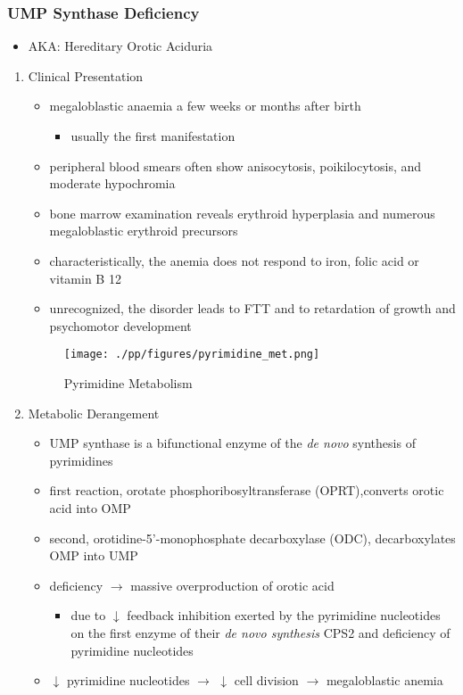 \documentclass{scrartcl}
\begin{document}
\subsubsection{UMP Synthase Deficiency}
\label{sec:orgcf6b37e}
\begin{itemize}
\item AKA: Hereditary Orotic Aciduria
\end{itemize}
\begin{enumerate}
\item Clinical Presentation
\label{sec:orgd7c03c6}
\begin{itemize}
\item megaloblastic anaemia a few weeks or months after birth
\begin{itemize}
\item usually the first manifestation
\end{itemize}
\item peripheral blood smears often show anisocytosis, poikilocytosis, and
moderate hypochromia
\item bone marrow examination reveals erythroid hyperplasia and numerous
megaloblastic erythroid precursors
\item characteristically, the anemia does not respond to iron, folic acid
or vitamin B 12
\item unrecognized, the disorder leads to FTT and to retardation of growth
and psychomotor development
\end{itemize}

\begin{figure}[htbp]
\centering
\texttt{[image: ./pp/figures/pyrimidine\_met.png]}
\caption{\label{fig:org9fbfec8}
Pyrimidine Metabolism}
\end{figure}

\item Metabolic Derangement
\label{sec:org9fef4a5}

\begin{itemize}
\item UMP synthase is a bifunctional enzyme of the \emph{de novo} synthesis of
pyrimidines
\item first reaction, orotate phosphoribosyltransferase (OPRT),converts
orotic acid into OMP
\item second, orotidine-5’-monophosphate decarboxylase (ODC),
decarboxylates OMP into UMP
\item deficiency \(\to\) massive overproduction of orotic acid
\begin{itemize}
\item due to \(\downarrow\) feedback inhibition exerted by the pyrimidine
nucleotides on the first enzyme of their \emph{de novo synthesis} CPS2
and deficiency of pyrimidine nucleotides
\end{itemize}
\item \(\downarrow\) pyrimidine nucleotides \(\to\) \(\downarrow\) cell division \(\to\) megaloblastic anemia
\end{itemize}


\end{enumerate}
\end{document}
